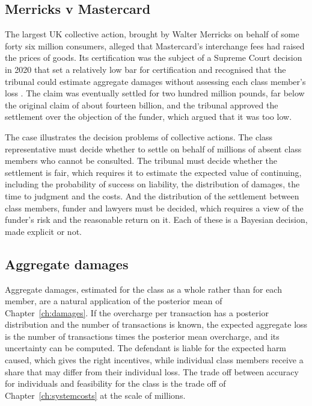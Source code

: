 \subsection{Merricks v Mastercard}

The largest UK collective action, brought by Walter Merricks on behalf of some forty six million consumers, alleged that Mastercard's interchange fees had raised the prices of goods. Its certification was the subject of a Supreme Court decision in 2020 that set a relatively low bar for certification and recognised that the tribunal could estimate aggregate damages without assessing each class member's loss \citep{merricks2020}. The claim was eventually settled for two hundred million pounds, far below the original claim of about fourteen billion, and the tribunal approved the settlement over the objection of the funder, which argued that it was too low.

The case illustrates the decision problems of collective actions. The class representative must decide whether to settle on behalf of millions of absent class members who cannot be consulted. The tribunal must decide whether the settlement is fair, which requires it to estimate the expected value of continuing, including the probability of success on liability, the distribution of damages, the time to judgment and the costs. And the distribution of the settlement between class members, funder and lawyers must be decided, which requires a view of the funder's risk and the reasonable return on it. Each of these is a Bayesian decision, made explicit or not.

\subsection{Aggregate damages}

Aggregate damages, estimated for the class as a whole rather than for each member, are a natural application of the posterior mean of Chapter~\ref{ch:damages}. If the overcharge per transaction has a posterior distribution and the number of transactions is known, the expected aggregate loss is the number of transactions times the posterior mean overcharge, and its uncertainty can be computed. The defendant is liable for the expected harm caused, which gives the right incentives, while individual class members receive a share that may differ from their individual loss. The trade off between accuracy for individuals and feasibility for the class is the trade off of Chapter~\ref{ch:systemcosts} at the scale of millions.

